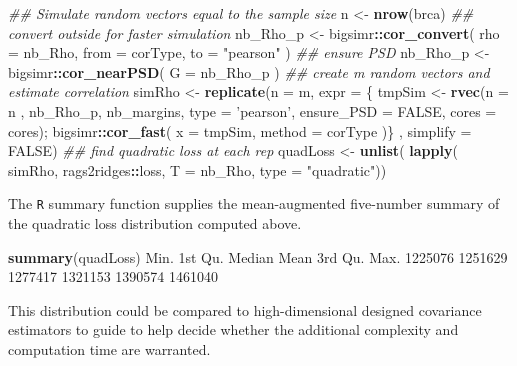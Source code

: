 \documentclass[]{article}
\newenvironment{Shaded}{\begin{snugshade}}{\end{snugshade}}
\newcommand{\CommentTok}[1]{\textcolor[rgb]{0.56,0.35,0.01}{\textit{#1}}}
\newcommand{\DataTypeTok}[1]{\textcolor[rgb]{0.13,0.29,0.53}{#1}}
\newcommand{\DecValTok}[1]{\textcolor[rgb]{0.00,0.00,0.81}{#1}}
\newcommand{\KeywordTok}[1]{\textcolor[rgb]{0.13,0.29,0.53}{\textbf{#1}}}
\newcommand{\NormalTok}[1]{#1}
\newcommand{\OperatorTok}[1]{\textcolor[rgb]{0.81,0.36,0.00}{\textbf{#1}}}
\newcommand{\OtherTok}[1]{\textcolor[rgb]{0.56,0.35,0.01}{#1}}
\newcommand{\StringTok}[1]{\textcolor[rgb]{0.31,0.60,0.02}{#1}}
\begin{document}
\begin{Shaded}
\begin{Highlighting}[]
\CommentTok{## Simulate random vectors equal to the sample size}
\NormalTok{n <-}\StringTok{ }\KeywordTok{nrow}\NormalTok{(brca)}
\CommentTok{## convert outside for faster simulation}
\NormalTok{nb_Rho_p <-}\StringTok{ }\NormalTok{bigsimr}\OperatorTok{::}\KeywordTok{cor_convert}\NormalTok{( }\DataTypeTok{rho =}\NormalTok{ nb_Rho,}
                                 \DataTypeTok{from =}\NormalTok{ corType, }\DataTypeTok{to =} \StringTok{"pearson"}\NormalTok{ )}
\CommentTok{## ensure PSD}
\NormalTok{nb_Rho_p <-}\StringTok{ }\NormalTok{bigsimr}\OperatorTok{::}\KeywordTok{cor_nearPSD}\NormalTok{( }\DataTypeTok{G =}\NormalTok{ nb_Rho_p )}
\CommentTok{## create m random vectors and estimate correlation}
\NormalTok{simRho <-}\StringTok{ }\KeywordTok{replicate}\NormalTok{(}\DataTypeTok{n =}\NormalTok{ m,}
  \DataTypeTok{expr =}\NormalTok{ \{ tmpSim <-}\StringTok{ }\KeywordTok{rvec}\NormalTok{(}\DataTypeTok{n =}\NormalTok{ n , nb_Rho_p, nb_margins,}
    \DataTypeTok{type =} \StringTok{'pearson'}\NormalTok{, }\DataTypeTok{ensure_PSD =} \OtherTok{FALSE}\NormalTok{, }\DataTypeTok{cores =}\NormalTok{ cores);}
\NormalTok{    bigsimr}\OperatorTok{::}\KeywordTok{cor_fast}\NormalTok{( }\DataTypeTok{x =}\NormalTok{ tmpSim, }\DataTypeTok{method =}\NormalTok{ corType )\} ,}
\DataTypeTok{simplify =} \OtherTok{FALSE}\NormalTok{)}
\CommentTok{## find quadratic loss at each rep}
\NormalTok{quadLoss <-}\StringTok{ }\KeywordTok{unlist}\NormalTok{( }\KeywordTok{lapply}\NormalTok{( simRho, rags2ridges}\OperatorTok{::}\NormalTok{loss,}
                           \DataTypeTok{T =}\NormalTok{ nb_Rho, }\DataTypeTok{type =} \StringTok{"quadratic"}\NormalTok{))}
\end{Highlighting}
\end{Shaded}

The \texttt{R} summary function supplies the mean-augmented five-number summary of the quadratic loss distribution computed above.

\begin{Shaded}
\begin{Highlighting}[]
\KeywordTok{summary}\NormalTok{(quadLoss)}
\NormalTok{   Min. 1st Qu.  Median    Mean 3rd Qu.    Max. }
\DecValTok{1225076} \DecValTok{1251629} \DecValTok{1277417} \DecValTok{1321153} \DecValTok{1390574} \DecValTok{1461040} 
\end{Highlighting}
\end{Shaded}

This distribution could be compared to high-dimensional designed covariance estimators to guide to help decide whether the additional complexity and computation time are warranted.
\end{document}
